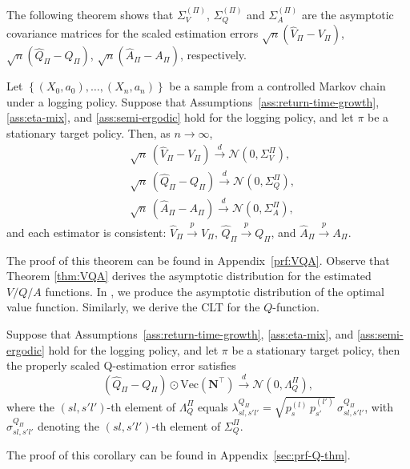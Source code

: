 \documentclass[twoside,11pt]{article}
\newcommand{\pow}[1]{^{(#1)}}%
\renewcommand{\Vec}[1]{\text{Vec}\lp #1\rp}
\numberwithin{equation}{section}
\newcommand{\lp}{\left(}
\newcommand{\rp}{\right)}
\newcommand{\Ncal}{\mathcal{N}}
\newcommand{\indexeddata}{\left\{(X_0,a_0),\dots,(X_n,a_n)\right\}}
\begin{document}
The following theorem shows that $\Sigma_V\pow \Pi$, $\Sigma_Q\pow \Pi$ and $\Sigma_A\pow \Pi$ are the asymptotic covariance matrices for the scaled estimation errors $ \sqrt{n}\lp\hat V_\Pi - V_\Pi\rp$, $ \sqrt{n}\lp\hat Q_\Pi - Q_\Pi\rp$, $ \sqrt{n}\lp\hat A_\Pi - A_\Pi\rp$, respectively.
\begin{theorem}
\label{thm:VQA}
Let $\indexeddata$ be a sample from a controlled Markov chain under a logging policy. 
Suppose that Assumptions~\ref{ass:return-time-growth}, \ref{ass:eta-mix}, and \ref{ass:semi-ergodic} hold for the logging policy, and let $\pi$ be a stationary target policy.
Then, as $n\to\infty$,
\begin{align*}
&\sqrt{n}\,(\hat V_\Pi - V_\Pi) \overset{d}{\rightarrow} \Ncal(0,\Sigma_V^\Pi), \\
&\sqrt{n}\,(\hat Q_\Pi - Q_\Pi)
\overset{d}{\rightarrow} \Ncal(0,\Sigma_Q^\Pi), \\
&\sqrt{n}\,(\hat A_\Pi - A_\Pi) \overset{d}{\rightarrow} \Ncal(0,\Sigma_A^\Pi),
\end{align*}
and each estimator is consistent:
$\hat V_\Pi\overset{p}{\to}V_\Pi$, 
$\hat Q_\Pi\overset{p}{\to}Q_\Pi$, and
$\hat A_\Pi\overset{p}{\to}A_\Pi$.
\end{theorem}
The proof of this theorem can be found in Appendix~\ref{prf:VQA}. Observe that Theorem \ref{thm:VQA} derives the asymptotic distribution for the estimated $V/Q/A$ functions. In , we produce the asymptotic distribution of the optimal value function. Similarly, we derive the CLT for the $Q$-function.
\begin{corollary}
\label{cor:Q-proper}
Suppose that Assumptions~\ref{ass:return-time-growth}, \ref{ass:eta-mix}, and \ref{ass:semi-ergodic} hold for the logging policy, and let $\pi$ be a stationary target policy, then the properly scaled Q-estimation error satisfies
\[
(\hat Q_\Pi - Q_\Pi) \odot  \Vec{\mathbf{N}^\top} \overset{d}{\rightarrow} 
\Ncal \lp 0, \Lambda_Q^\Pi \rp,
\]
where the $(sl,s'l')$-th element of $\Lambda_Q^\Pi$ equals 
$\lambda_{sl,s'l'}^{Q_\Pi}=\sqrt{p_s \pow l\,p_{s'} \pow{l'}}\,\sigma_{sl,s'l'}^{Q_\Pi}$, 
with $\sigma_{sl,s'l'}^{Q_\Pi}$ denoting the $(sl,s'l')$-th element of $\Sigma_Q^\Pi$.
\end{corollary}
The proof of this corollary can be found in Appendix~\ref{sec:prf-Q-thm}.
\end{document}
